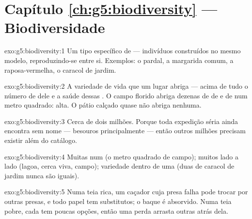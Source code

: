 \section*{Capítulo \ref{ch:g5:biodiversity} --- Biodiversidade}

\begin{solution}{exo:g5:biodiversity:1}
Um tipo específico de  --- indivíduos construídos no mesmo
modelo, reproduzindo-se entre si. Exemplos: o pardal, a margarida
comum, a raposa-vermelha, o caracol de jardim.
\end{solution}

\begin{solution}{exo:g5:biodiversity:2}
A variedade de vida que um lugar abriga --- acima de tudo o número
de  dele e a saúde dessas . O campo florido abriga
dezenas de  de  e de  num metro quadrado:
 alta. O pátio calçado quase não abriga nenhuma.
\end{solution}

\begin{solution}{exo:g5:biodiversity:3}
Cerca de dois milhões. Porque toda expedição séria ainda encontra
 sem nome --- besouros principalmente --- então outros
milhões precisam existir além do catálogo.
\end{solution}

\begin{solution}{exo:g5:biodiversity:4}
Muitas  num  (o metro quadrado de campo); muitos
 lado a lado (lagoa, cerca viva, campo); variedade dentro de
uma  (duas  de caracol de jardim nunca são iguais).
\end{solution}

\begin{solution}{exo:g5:biodiversity:5}
Numa teia rica, um caçador cuja presa falha pode trocar por outras
presas, e todo papel tem substitutos; o baque é absorvido. Numa teia
pobre, cada  tem poucas opções, então uma perda arrasta
outras atrás dela.
\end{solution}


